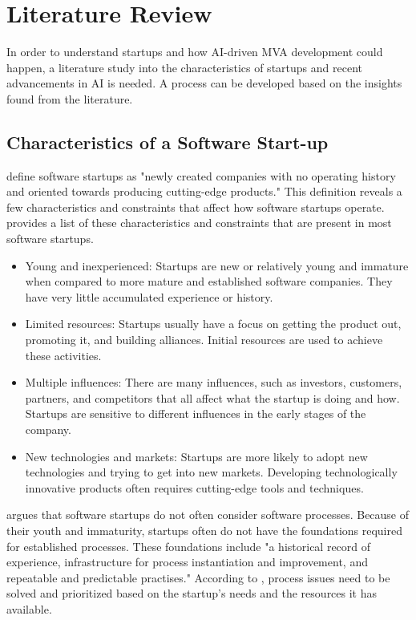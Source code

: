 \section{Literature Review}

In order to understand startups and how AI-driven MVA development could happen, a literature study into the characteristics of startups and recent advancements in AI is needed. A process can be developed based on the insights found from the literature.

\subsection{Characteristics of a Software Start-up}
\textcite{giardinoSoftwareDevelopmentStartup2016} define software startups as "newly created companies with no operating history and oriented towards producing cutting-edge products." This definition reveals a few characteristics and constraints that affect how software startups operate. \textcite{suttonRoleProcessSoftwareJuly-Aug./2000} provides a list of these characteristics and constraints that are present in most software startups.
\begin{itemize}
	\item Young and inexperienced: Startups are new or relatively young and immature when compared to more mature and established software companies. They have very little accumulated experience or history.
	\item Limited resources: Startups usually have a focus on getting the product out, promoting it, and building alliances. Initial resources are used to achieve these activities.
	\item Multiple influences: There are many influences, such as investors, customers, partners, and competitors that all affect what the startup is doing and how. Startups are sensitive to different influences in the early stages of the company.
	\item New technologies and markets: Startups are more likely to adopt new technologies and trying to get into new markets. Developing technologically innovative products often requires cutting-edge tools and techniques.
\end{itemize}

\citeauthor{suttonRoleProcessSoftwareJuly-Aug./2000} argues that software startups do not often consider software processes. Because of their youth and immaturity, startups often do not have the foundations required for established processes. These foundations include "a historical record of experience, infrastructure for process instantiation and improvement, and repeatable and predictable practises." According to \citeauthor{suttonRoleProcessSoftwareJuly-Aug./2000}, process issues need to be solved and prioritized based on the startup's needs and the resources it has available.

